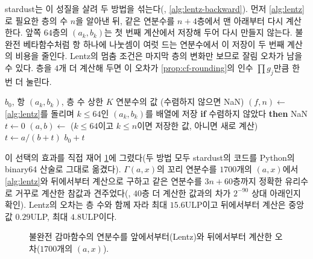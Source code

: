 stardust는 이 성질을 살려 두 방법을 섞는다(, \cref{alg:lentz-backward}). 먼저 \cref{alg:lentz}로 필요한 층의 수 $n$을 알아낸 뒤, 같은 연분수를 $n+4$층에서 맨 아래부터 다시 계산한다. 앞쪽 $64$층의 $(a_k,b_k)$는 첫 번째 계산에서 저장해 두어 다시 만들지 않는다. 불완전 베타함수처럼 항 하나에 나눗셈이 여럿 드는 연분수에서 이 저장이 두 번째 계산의 비용을 줄인다. Lentz의 멈춤 조건은 마지막 층의 변화만 보므로 잘림 오차가 남을 수 있다. 층을 $4$개 더 계산해 두면 이 오차가 \cref{prop:cf-rounding}의 인수 $\prod g_j$만큼 한 번 더 눌린다.

\begin{algorithm}[htbp]
\begin{algorithmic}[1]
\Require $b_0$, 항 $(a_k,b_k)$, 층 수 상한 $K$
\Ensure 연분수의 값 (수렴하지 않으면 NaN)
\State $(f,n)\gets$ \cref{alg:lentz}를 돌리며 $k\le64$인 $(a_k,b_k)$를 배열에 저장 
\State \textbf{if} 수렴하지 않았다 \textbf{then} \Return NaN
\State $t\gets0$
  \State $(a,b)\gets$ ($k\le64$이고 $k\le n$이면 저장한 값, 아니면 새로 계산)
  \State $t\gets a/(b+t)$
\EndFor
\State \Return $b_0+t$
\end{algorithmic}
\caption{앞에서 층 수를 찾고 뒤에서 값을 구하는 연분수 (stardust )}
\label{alg:lentz-backward}
\end{algorithm}

이 선택의 효과를 직접 재어 \cref{fig:cf-errors}에 그렸다(두 방법 모두 stardust의 코드를 Python의 binary64 산술로 그대로 옮겼다). $\Gamma(a,x)$의 꼬리 연분수를 $1700$개의 $(a,x)$에서 \cref{alg:lentz}와 뒤에서부터 계산으로 구하고 같은 연분수를 $3n+60$층까지 정확한 유리수로 거꾸로 계산한 참값과 견주었다(, $40$층 더 계산한 값과의 차가 $2^{-90}$ 상대 아래인지 확인). Lentz의 오차는 층 수와 함께 자라 최대 $15.6$ULP이고 뒤에서부터 계산은 중앙값 $0.29$ULP, 최대 $4.8$ULP이다.

\begin{figure}[htbp]
\centering
{}
\caption{불완전 감마함수의 연분수를 앞에서부터(Lentz)와 뒤에서부터 계산한 오차($1700$개의 $(a,x)$).}
\label{fig:cf-errors}
\end{figure}

